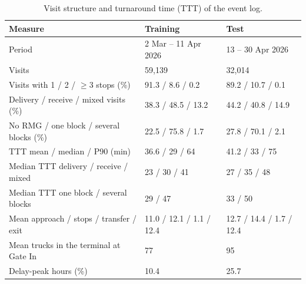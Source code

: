 \begin{table}[htbp]
\centering
\small
\begin{tabularx}{\textwidth}{YL{3.0cm}L{3.0cm}}
\toprule
\textbf{Measure} & \textbf{Training} & \textbf{Test} \\
\midrule
Period & 2 Mar -- 11 Apr 2026 & 13 -- 30 Apr 2026 \\
Visits & 59,139 & 32,014 \\
Visits with 1 / 2 / $\geq$3 stops (\%) & 91.3 / 8.6 / 0.2 & 89.2 / 10.7 / 0.1 \\
Delivery / receive / mixed visits (\%) & 38.3 / 48.5 / 13.2 & 44.2 / 40.8 / 14.9 \\
No RMG / one block / several blocks (\%) & 22.5 / 75.8 / 1.7 & 27.8 / 70.1 / 2.1 \\
\midrule
TTT mean / median / P90 (min) & 36.6 / 29 / 64 & 41.2 / 33 / 75 \\
Median TTT delivery / receive / mixed & 23 / 30 / 41 & 27 / 35 / 48 \\
Median TTT one block / several blocks & 29 / 47 & 33 / 50 \\
Mean approach / stops / transfer / exit & 11.0 / 12.1 / 1.1 / 12.4 & 12.7 / 14.4 / 1.7 / 12.4 \\
Mean trucks in the terminal at Gate In & 77 & 95 \\
Delay-peak hours (\%) & 10.4 & 25.7 \\
\bottomrule
\end{tabularx}
\par{}
\caption{Visit structure and turnaround time (TTT) of the event log.}
\label{tab:obs_descriptives}
\end{table}
